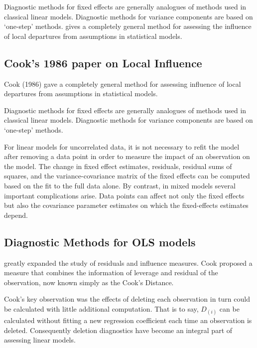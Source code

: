 \documentclass[12pt, a4paper]{report}
\theoremstyle{plain}
\theoremstyle{definition}
\theoremstyle{remark}
\begin{document}
Diagnostic methods for fixed effects are generally analogues of methods used in classical linear models.
Diagnostic methods for variance components are based on `one-step' methods. \citet{cook86} gives a completely general method for assessing the influence of local departures from assumptions in statistical models. 



\subsection{Cook's 1986 paper on Local Influence}%

Cook (1986) gave a completely general method for assessing influence of local departures from
assumptions in statistical models.


Diagnostic methods for fixed effects are generally analogues of methods used in classical linear models. Diagnostic methods for variance components are based on `one-step' methods.

For linear models for uncorrelated data, it is not necessary to refit the model after removing a data point in order to measure the impact of an observation on the model. The change in fixed effect estimates, residuals, residual sums of squares, and the variance-covariance matrix of the fixed effects can be computed based on the fit to the full data alone. By contrast, in mixed models several important complications arise. Data points can affect not only the fixed effects but also the covariance parameter estimates on which the fixed-effects estimates depend. 



\subsection{Diagnostic Methods for OLS models}
\citet{cook77} greatly expanded the study of residuals and influence measures.  Cook proposed a measure that combines the information of leverage and residual of the observation, now known simply as the Cook's Distance. 

Cook's key observation was the effects of deleting each observation in turn could be calculated with little additional computation. That is to say, $D_{(i)}$ can be calculated without fitting a new regression coefficient each time an observation is deleted. Consequently deletion diagnostics have become an integral part of assessing linear models. 
\end{document}

